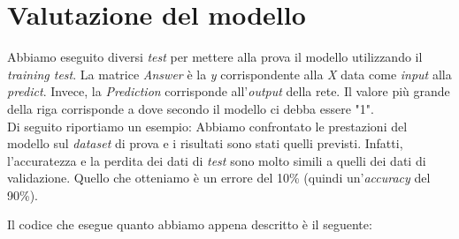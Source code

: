 \section{Valutazione del modello}
Abbiamo eseguito diversi \textit{test} per mettere alla prova il modello utilizzando il \textit{training test}. La matrice \textit{Answer} è la \textit{y} corrispondente alla \textit{X} data come \textit{input} alla \textit{predict}. Invece, la \textit{Prediction} corrisponde all'\textit{output} della rete. Il valore più grande della riga corrisponde a dove secondo il modello ci debba essere "1".\\
\newline
Di seguito riportiamo un esempio:
\vspace*{2ex}
\vspace*{2ex}
\noindent Abbiamo confrontato le prestazioni del modello sul \textit{dataset} di prova e i risultati sono stati quelli previsti. Infatti, l'accuratezza e la perdita dei dati di \textit{test} sono molto simili a quelli dei dati di validazione. Quello che otteniamo è un errore del 10\% (quindi un'\textit{accuracy} del 90\%).
\vspace*{2ex}
\vspace*{2ex}

Il codice che esegue quanto abbiamo appena descritto è il seguente:
\vspace*{2ex}
\vspace*{2ex}